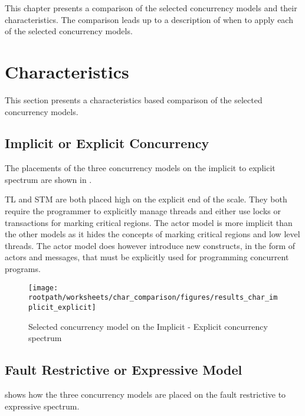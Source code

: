 \makeatletter {}\makeatother
{}
This chapter presents a comparison of the selected concurrency models and their characteristics. The comparison leads up to a description of when to apply each of the selected concurrency models.
\label{chap:results}

\section{Characteristics}
This section presents a characteristics based comparison of the selected concurrency models.

\subsection{Implicit or Explicit Concurrency}
The placements of the three concurrency models on the implicit to explicit spectrum are shown in .

\ac{TL} and \ac{STM} are both placed high on the explicit end of the scale. They both require the programmer to explicitly manage threads and either use locks or transactions for marking critical regions. The actor model is more implicit than the other models as it hides the concepts of marking critical regions and low level threads. The actor model does however introduce new constructs, in the form of actors and messages, that must be explicitly used for programming concurrent programs.

\begin{figure}[htbp]
\centering
 \texttt{[image: \\rootpath/worksheets/char\_comparison/figures/results\_char\_implicit\_explicit]} 
 \caption{Selected concurrency model on the Implicit - Explicit concurrency spectrum}
\label{fig:results_char_impli_expli}
\end{figure}

\subsection{Fault Restrictive or Expressive Model}
 shows how the three concurrency models are placed on the fault restrictive to expressive spectrum.

